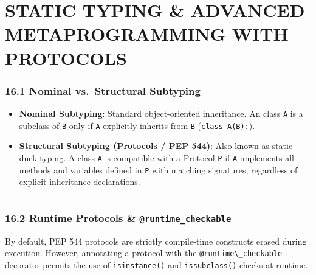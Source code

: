\hypertarget{static-typing-advanced-metaprogramming-with-protocols}{%
\chapter{STATIC TYPING \& ADVANCED METAPROGRAMMING WITH
PROTOCOLS}\label{static-typing-advanced-metaprogramming-with-protocols}}

\hypertarget{nominal-vs.-structural-subtyping}{%
\subsection{16.1 Nominal vs.~Structural
Subtyping}\label{nominal-vs.-structural-subtyping}}

\begin{itemize}
\tightlist
\item
  \textbf{Nominal Subtyping}: Standard object-oriented inheritance. An
  class \passthrough{\lstinline!A!} is a subclass of
  \passthrough{\lstinline!B!} only if \passthrough{\lstinline!A!}
  explicitly inherits from \passthrough{\lstinline!B!}
  (\passthrough{\lstinline!class A(B):!}).
\item
  \textbf{Structural Subtyping (Protocols / PEP 544)}: Also known as
  static duck typing. A class \passthrough{\lstinline!A!} is compatible
  with a Protocol \passthrough{\lstinline!P!} if
  \passthrough{\lstinline!A!} implements all methods and variables
  defined in \passthrough{\lstinline!P!} with matching signatures,
  regardless of explicit inheritance declarations.
\end{itemize}

\begin{center}\rule{0.5\linewidth}{0.5pt}\end{center}

\hypertarget{runtime-protocols-runtime_checkable}{%
\subsection{\texorpdfstring{16.2 Runtime Protocols \&
\texttt{@runtime\_checkable}}{16.2 Runtime Protocols \& @runtime\_checkable}}\label{runtime-protocols-runtime_checkable}}

By default, PEP 544 protocols are strictly compile-time constructs
erased during execution. However, annotating a protocol with the
\passthrough{\lstinline!@runtime\_checkable!} decorator permits the use
of \passthrough{\lstinline!isinstance()!} and
\passthrough{\lstinline!issubclass()!} checks at runtime.

